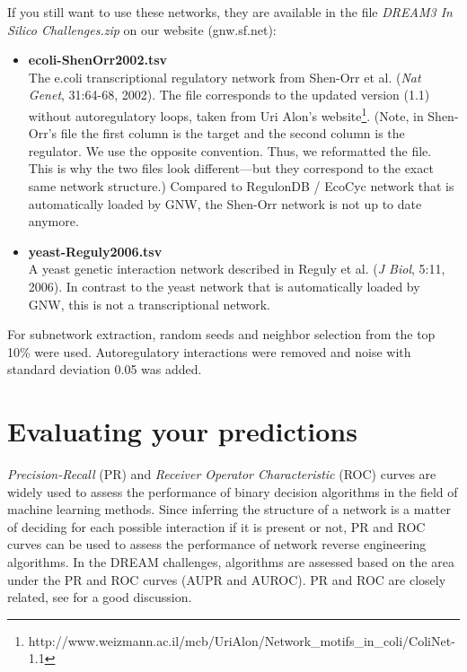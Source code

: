 \documentclass{llncs}
\newenvironment{mylist}{
\begin{itemize}
}{\end{itemize}}
\begin{document}
If you still want to use these networks, they are available in the file \emph{DREAM3 In Silico Challenges.zip} on our website (gnw.sf.net):
\begin{mylist}
\item \textbf{ecoli-ShenOrr2002.tsv}\\
The e.coli transcriptional regulatory network from Shen-Orr et al. (\emph{Nat Genet}, 31:64-68, 2002). The file corresponds to the updated version (1.1) without autoregulatory loops, taken from Uri Alon's website\footnote{http://www.weizmann.ac.il/mcb/UriAlon/Network\_motifs\_in\_coli/ColiNet-1.1}. (Note, in Shen-Orr's file the first column is the target and the second column is the regulator. We use the opposite convention. Thus, we reformatted the file. This is why the two files look different---but they correspond to the exact same network structure.) Compared to RegulonDB / EcoCyc network that is automatically loaded by GNW, the Shen-Orr network is not up to date anymore.\\

\item \textbf{yeast-Reguly2006.tsv}\\
A yeast genetic interaction network described in Reguly et al. (\emph{J Biol}, 5:11, 2006). In contrast to the yeast network that is automatically loaded by GNW, this is not a transcriptional network.
\end{mylist}

For subnetwork extraction, random seeds and neighbor selection from the top 10\% were used. Autoregulatory interactions were removed and noise with standard deviation 0.05 was added.


\section{Evaluating your predictions}

\emph{Precision-Recall} (PR) and \emph{Receiver Operator Characteristic} (ROC) curves are widely used to assess the performance of binary decision algorithms in the field of machine learning methods. Since inferring the structure of a network is a matter of deciding for each possible interaction if it is present or not, PR and ROC curves can be used to assess the performance of network reverse engineering algorithms. In the DREAM challenges, algorithms are assessed based on the area under the PR and ROC curves (AUPR and AUROC). PR and ROC are closely related, see \citet{Davis2006} for a good discussion. \\
\end{document}
